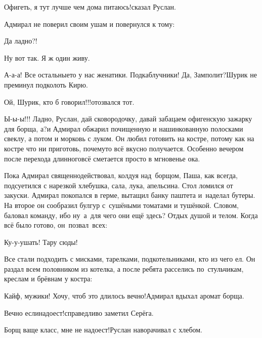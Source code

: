 \diagdash Офигеть, я тут лучше чем дома питаюсь!\mdash сказал Руслан.

Адмирал не поверил своим ушам и повернулся к тому:

\diagdash Да ладно?!

\diagdash Ну вот так. Я ж один живу.

\diagdash А-а-а! Все остальные\sdash то у нас женатики. Подкаблучники! Да, Замполит?\mdash Шурик не преминул подколоть Кирю.

\diagdash Ой, Шурик, кто б говорил!!!\mdash отозвался тот.

\diagdash Ы-ы-ы!!! Ладно, Руслан, дай сковородочку, давай забацаем офигенскую зажарку для борща, а?\mdash и Адмирал обжарил почищенную и нашинкованную полосками свеклу, а потом и морковь с луком. Он любил готовить на костре, потому как на костре что ни приготовь, почему\sdash то всё вкусно получается. Особенно вечером после перехода длинного\mdash всё сметается просто в мгновенье ока.

Пока Адмирал священнодействовал, колдуя над~борщом, Паша, как всегда, подсуетился с нарезкой хлебушка, сала, лука, апельсина. Стол ломился от закуски. Адмирал покопался в герме, вытащил банку паштета и~наделал бутеры. На второе он сообразил булгур с~сушёными томатами и тушёнкой. Словом, баловал команду, ибо ну~а~для чего они ещё здесь? Отдых душой и телом. Когда всё было готово, он~позвал~всех:

\diagdash Ку-у-ушать! Тару сюды!

Все стали подходить с мисками, тарелками, подкотельниками, кто из чего ел. Он раздал всем половником из котелка, а после ребята расселись по~стульчикам, креслам и брёвнам у костра:

\diagdash Кайф, мужики! Хочу, чтоб это длилось вечно!\mdash Адмирал вдыхал аромат борща.

\diagdash Вечно если\mdash надоест!\mdash справедливо заметил Серёга.

\diagdash Борщ ваще класс, мне не надоест!\mdash Руслан наворачивал с хлебом.

%	
%	
%	
%	
%	

